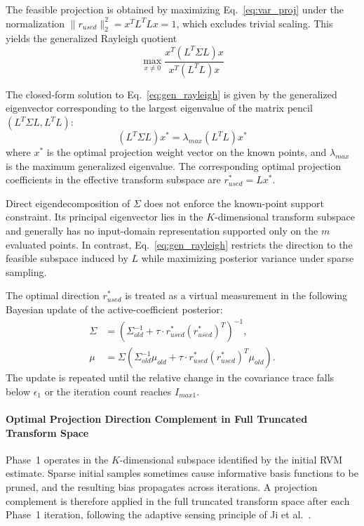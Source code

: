 \documentclass[lettersize,journal]{IEEEtran}
\begin{document}
The feasible projection is obtained by maximizing Eq.~\eqref{eq:var_proj} under the normalization $\|r_{used}\|_2^2=x^T L^T Lx=1$, which excludes trivial scaling. This yields the generalized Rayleigh quotient
\begin{equation}
\max_{x \neq 0} \frac{x^T (L^T \Sigma L) x}{x^T (L^T L) x}
\label{eq:gen_rayleigh}
\end{equation}

The closed-form solution to Eq.~\eqref{eq:gen_rayleigh} is given by the generalized eigenvector corresponding to the largest eigenvalue of the matrix pencil $(L^T \Sigma L, L^T L)$:
\begin{equation}
(L^T \Sigma L) x^* = \lambda_{max} (L^T L) x^*
\label{eq:gen_eig}
\end{equation}
where $x^*$ is the optimal projection weight vector on the known points, and $\lambda_{max}$ is the maximum generalized eigenvalue. The corresponding optimal projection coefficients in the effective transform subspace are $r_{used}^* = L x^*$.

Direct eigendecomposition of $\Sigma$ does not enforce the known-point support constraint. Its principal eigenvector lies in the $K$-dimensional transform subspace and generally has no input-domain representation supported only on the $m$ evaluated points. In contrast, Eq.~\eqref{eq:gen_rayleigh} restricts the direction to the feasible subspace induced by $L$ while maximizing posterior variance under sparse sampling.

The optimal direction $r_{used}^*$ is treated as a virtual measurement in the following Bayesian update of the active-coefficient posterior:
\begin{equation}
\begin{aligned}
\Sigma &= \left( \Sigma_{old}^{-1} + \tau \cdot r_{used}^* (r_{used}^*)^T \right)^{-1},\\
\mu &= \Sigma \left( \Sigma_{old}^{-1} \mu_{old}
+ \tau \cdot r_{used}^* (r_{used}^*)^T \mu_{old} \right).
\end{aligned}
\end{equation}
The update is repeated until the relative change in the covariance trace falls below $\epsilon_1$ or the iteration count reaches $I_{max1}$.

\paragraph{Optimal Projection Direction Complement in Full Truncated Transform Space}
Phase~1 operates in the $K$-dimensional subspace identified by the initial RVM estimate. Sparse initial samples sometimes cause informative basis functions to be pruned, and the resulting bias propagates across iterations. A projection complement is therefore applied in the full truncated transform space after each Phase~1 iteration, following the adaptive sensing principle of Ji et al.\ \cite{JiXueCarin2008BCS}.
\end{document}
